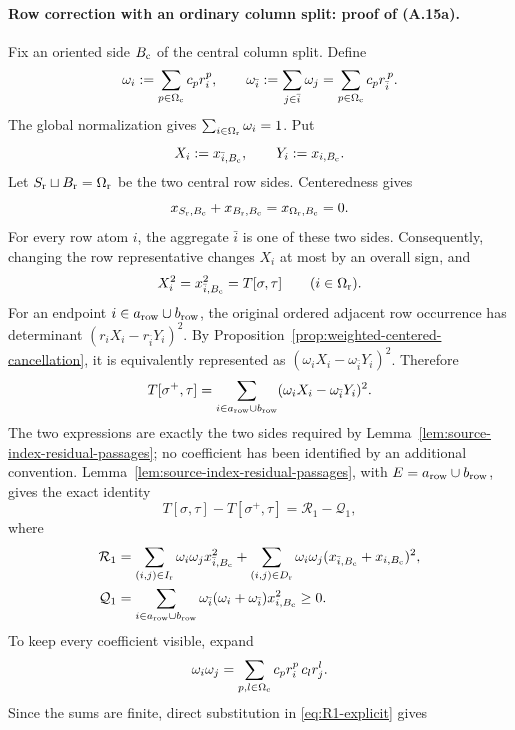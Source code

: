 \documentclass[11pt]{article}
\begin{document}
\paragraph{Row correction with an ordinary column split: proof of (A.15a).}
Fix an oriented side $B_{\rm c}$ of the central column split.  Define
\[
\omega_i:=\sum_{p\in\Omega_{\rm c}}c_pr_i^p,
\qquad
\omega_{\bar i}:=\sum_{j\in\bar i}\omega_j
                 =\sum_{p\in\Omega_{\rm c}}c_pr_{\bar i}^{\,p}.
\]
The global normalization gives
$\sum_{i\in\Omega_{\rm r}}\omega_i=1$.  Put
\[
X_i:=x_{\bar i,B_{\rm c}},
\qquad
Y_i:=x_{i,B_{\rm c}}.
\]
Let $S_{\rm r}\sqcup B_{\rm r}=\Omega_{\rm r}$ be the two central row
sides.  Centeredness gives
\[
x_{S_{\rm r},B_{\rm c}}+x_{B_{\rm r},B_{\rm c}}
=x_{\Omega_{\rm r},B_{\rm c}}=0.
\]
For every row atom $i$, the aggregate $\bar i$ is one of these two sides.
Consequently, changing the row representative changes $X_i$ at most by an
overall sign, and
\[
X_i^2=x_{\bar i,B_{\rm c}}^2=T[\sigma,\tau]
\qquad(i\in\Omega_{\rm r}).
\]
For an endpoint
$i\in a_{\rm row}\cup b_{\rm row}$, the original ordered adjacent row occurrence
has determinant $(r_iX_i-r_{\bar i}Y_i)^2$.  By
Proposition~\ref{prop:weighted-centered-cancellation}, it is equivalently
represented as $(\omega_iX_i-\omega_{\bar i}Y_i)^2$.  Therefore
\[
T[\sigma^+,\tau]
=\sum_{i\in a_{\rm row}\cup b_{\rm row}}
(\omega_iX_i-\omega_{\bar i}Y_i)^2.
\]
The two expressions are exactly the two sides required by
Lemma~\ref{lem:source-index-residual-passages}; no coefficient has been
identified by an additional convention.
Lemma~\ref{lem:source-index-residual-passages}, with
$E=a_{\rm row}\cup b_{\rm row}$, gives
the exact identity
\begin{equation}\label{eq:exact-left-residual-entry}
T[\sigma,\tau]-T[\sigma^+,\tau]
=\mathcal R_1-\mathcal Q_1,
\tag{A.15a}
\end{equation}
where
\begin{align}
\mathcal R_1
&=
\sum_{(i,j)\in I_{\rm r}}\omega_i\omega_jx_{\bar i,B_{\rm c}}^2
+\sum_{(i,j)\in D_{\rm r}}\omega_i\omega_j
   (x_{\bar i,B_{\rm c}}+x_{i,B_{\rm c}})^2,
\label{eq:R1-explicit}\\
\mathcal Q_1
&=
\sum_{i\in a_{\rm row}\cup b_{\rm row}}
\omega_{\bar i}(\omega_i+\omega_{\bar i})x_{i,B_{\rm c}}^2
\ge0.
\label{eq:Q1-explicit}
\end{align}
To keep every coefficient visible, expand
\[
\omega_i\omega_j
=\sum_{p,l\in\Omega_{\rm c}}c_pr_i^p\,c_lr_j^l.
\]
Since the sums are finite, direct substitution in
\eqref{eq:R1-explicit} gives
\end{document}
